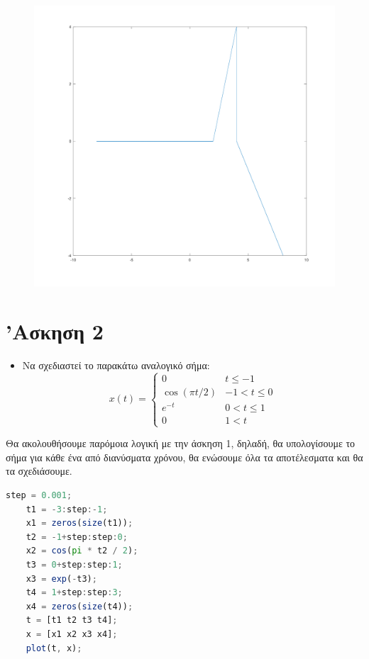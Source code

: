 \documentclass{article}
\begin{document}
\begin{figure}[H]
	\centering
	\includegraphics[width=\linewidth]{res/fig1.png}
\end{figure}

\section{'Ασκηση 2}

\begin{itemize}
	\item Να σχεδιαστεί το παρακάτω αναλογικό σήμα:
	\[
		x(t) = 
		\left\{
			\begin{array}{ll}
			0 & t \leq -1 \\
			\cos(\pi t/2) & -1 < t \leq 0 \\
			e^{-t} & 0 < t \leq 1 \\
			0 & 1 < t
		\end{array}
		\right.
	\]
\end{itemize}

Θα ακολουθήσουμε παρόμοια λογική με την άσκηση 1, δηλαδή, θα
υπολογίσουμε το σήμα για κάθε ένα από διανύσματα χρόνου, θα ενώσουμε
όλα τα αποτέλεσματα και θα τα σχεδιάσουμε.

\begin{lstlisting}[language=octave]
	step = 0.001;
	t1 = -3:step:-1;
	x1 = zeros(size(t1));
	t2 = -1+step:step:0;
	x2 = cos(pi * t2 / 2);
	t3 = 0+step:step:1;
	x3 = exp(-t3);
	t4 = 1+step:step:3;
	x4 = zeros(size(t4));
	t = [t1 t2 t3 t4];
	x = [x1 x2 x3 x4];
	plot(t, x);
\end{lstlisting}
\end{document}
